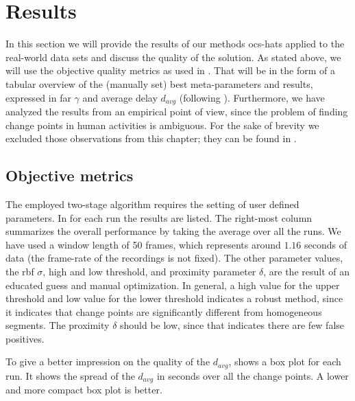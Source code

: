\section{Results}\label{sec:real_world_results}
In this section we will provide the results of our methods \gls{ocs-hats} applied to the real-world data sets and discuss the quality of the solution.
As stated above, we will use the objective quality metrics as used in .
That will be in the form of a tabular overview of the (manually set) best meta-parameters and results, expressed in \gls{far} $\gamma$ and average delay $d_{avg}$ (following ).
Furthermore, we have analyzed the results from an empirical point of view, since the problem of finding change points in human activities is ambiguous.
For the sake of brevity we excluded those observations from this chapter; they can be found in .

\subsection{Objective metrics}
The employed two-stage algorithm requires the setting of user defined parameters.
In  for each run the results are listed.
The right-most column summarizes the overall performance by taking the average over all the runs.
We have used a window length of 50 frames, which represents around $1.16$ seconds of data (the frame-rate of the recordings is not fixed).
The other parameter values, \ie the \gls{rbf} $\sigma$, high and low threshold, and proximity parameter $\delta$, are the result of an educated guess and manual optimization.
In general, a high value for the upper threshold and low value for the lower threshold indicates a robust method, since it indicates that change points are significantly different from homogeneous segments.
The proximity $\delta$ should be low, since that indicates there are few false positives.

To give a better impression on the quality of the $d_{avg}$,  shows a box plot for each run.
It shows the spread of the $d_{avg}$ in seconds over all the change points.
A lower and more compact box plot is better.

